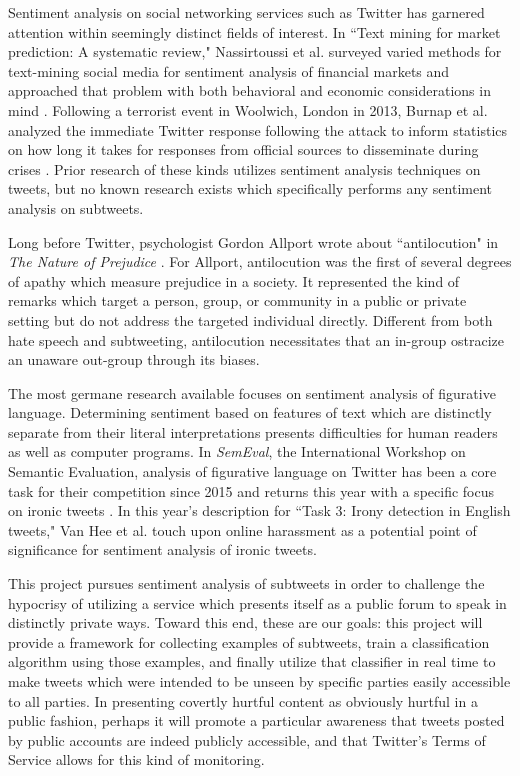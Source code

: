 \documentclass[11pt, twoside, reqno]{book}
\begin{document}
Sentiment analysis on social networking services such as Twitter has garnered attention within seemingly distinct fields of interest. In ``Text mining for market prediction: A systematic review," Nassirtoussi et al. surveyed varied methods for text-mining social media for sentiment analysis of financial markets and approached that problem with both behavioral and economic considerations in mind \cite{sentiment_analysis_markets}. Following a terrorist event in Woolwich, London in 2013, Burnap et al. analyzed the immediate Twitter response following the attack to inform statistics on how long it takes for responses from official sources to disseminate during crises \cite{sentiment_analysis_terrorism}. Prior research of these kinds utilizes sentiment analysis techniques on tweets, but no known research exists which specifically performs any sentiment analysis on subtweets.

Long before Twitter, psychologist Gordon Allport wrote about ``antilocution" in \textit{The Nature of Prejudice} \cite{antilocution}. For Allport, antilocution was the first of several degrees of apathy which measure prejudice in a society. It represented the kind of remarks which target a person, group, or community in a public or private setting but do not address the targeted individual directly. Different from both hate speech and subtweeting, antilocution necessitates that an in-group ostracize an unaware out-group through its biases.

The most germane research available focuses on sentiment analysis of figurative language. Determining sentiment based on features of text which are distinctly separate from their literal interpretations presents difficulties for human readers as well as computer programs. In \textit{SemEval}, the International Workshop on Semantic Evaluation, analysis of figurative language on Twitter has been a core task for their competition since 2015 \cite{semeval_2015} and returns this year with a specific focus on ironic tweets \cite{semeval_2018}. In this year's description for ``Task 3: Irony detection in English tweets," Van Hee et al. touch upon online harassment as a potential point of significance for sentiment analysis of ironic tweets.

This project pursues sentiment analysis of subtweets in order to challenge the hypocrisy of utilizing a service which presents itself as a public forum to speak in distinctly private ways. Toward this end, these are our goals: this project will provide a framework for collecting examples of subtweets, train a classification algorithm using those examples, and finally utilize that classifier in real time to make tweets which were intended to be unseen by specific parties easily accessible to all parties. In presenting covertly hurtful content as obviously hurtful in a public fashion, perhaps it will promote a particular awareness that tweets posted by public accounts are indeed publicly accessible, and that Twitter's Terms of Service \cite{twitter_tos} allows for this kind of monitoring.
\end{document}

